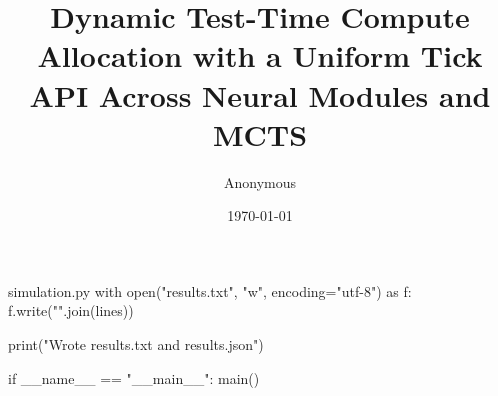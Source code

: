 \begin{filecontents*}{simulation.py}
    with open("results.txt", "w", encoding="utf-8") as f:
        f.write("\n".join(lines))

    print("Wrote results.txt and results.json")


if __name__ == "__main__":
    main()
\end{filecontents*}
\documentclass[10pt]{article}

\usepackage[T1]{fontenc}
\usepackage{lmodern}
\usepackage[margin=1in]{geometry}
\usepackage{microtype}
\usepackage{booktabs}
\usepackage{amsmath, amssymb, mathtools, bm}
\usepackage[dvipsnames]{xcolor}
\usepackage{float}
\usepackage{caption}
\usepackage{url}
\usepackage{hyperref}
\usepackage{enumitem}
\usepackage{adjustbox}
\usepackage[ruled,vlined,linesnumbered]{algorithm2e}
\usepackage{tikz}
\usepackage{pgfplots}
\pgfplotsset{compat=1.18}

\hypersetup{
  colorlinks=true,
  linkcolor=MidnightBlue,
  citecolor=MidnightBlue,
  urlcolor=MidnightBlue
}

\newcommand{\E}{\mathbb{E}}
\newcommand{\KL}{\mathrm{KL}}
\newcommand{\Var}{\mathrm{Var}}
\newcommand{\softmax}{\mathrm{softmax}}
\newcommand{\entropy}{\mathcal{H}}
\newcommand{\marginGap}{\Delta}
\newcommand{\tick}{\textsf{tick}}
\newcommand{\TickAPI}{\textsc{Tick-API}}
\newcommand{\model}{\textsc{Net}}
\newcommand{\budget}{\mathcal{B}}
\newcommand{\cost}{\mathsf{cost}}
\newcommand{\gain}{\widehat{\Delta}}

\title{\vspace{-0.25em}\textbf{Dynamic Test-Time Compute Allocation with a Uniform Tick API Across Neural Modules and MCTS}\vspace{0.25em}}
\author{Anonymous}
\date{\today}


\maketitle

